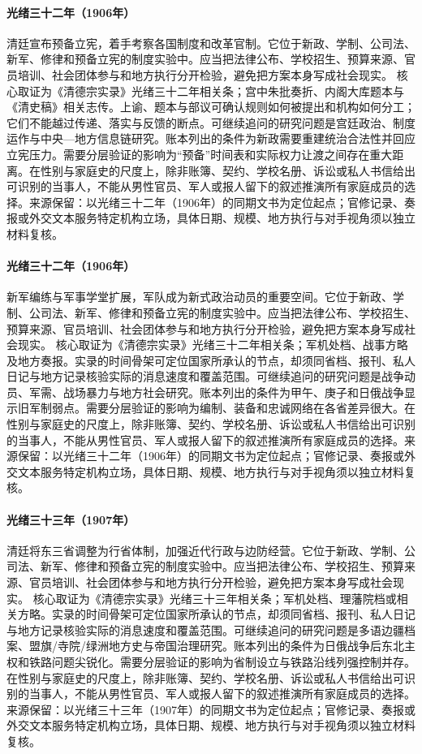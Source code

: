 \hypertarget{public:EQ-1906-CONSTITUTIONAL-PROMISE}{}\paragraph{光绪三十二年（1906年）}清廷宣布预备立宪，着手考察各国制度和改革官制。它位于新政、学制、公司法、新军、修律和预备立宪的制度实验中。应当把法律公布、学校招生、预算来源、官员培训、社会团体参与和地方执行分开检验，避免把方案本身写成社会现实。 核心取证为《清德宗实录》光绪三十二年相关条；宫中朱批奏折、内阁大库题本与《清史稿》相关志传。上谕、题本与部议可确认规则如何被提出和机构如何分工；它们不能越过传递、落实与反馈的断点。可继续追问的研究问题是宫廷政治、制度运作与中央—地方信息链研究。账本列出的条件为新政需要重建统治合法性并回应立宪压力。需要分层验证的影响为“预备”时间表和实际权力让渡之间存在重大距离。在性别与家庭史的尺度上，除非账簿、契约、学校名册、诉讼或私人书信给出可识别的当事人，不能从男性官员、军人或报人留下的叙述推演所有家庭成员的选择。来源保留：以光绪三十二年（1906年）的同期文书为定位起点；官修记录、奏报或外交文本服务特定机构立场，具体日期、规模、地方执行与对手视角须以独立材料复核。
\hypertarget{public:EQ-1906-NEW-ARMY-REFORM}{}\paragraph{光绪三十二年（1906年）}新军编练与军事学堂扩展，军队成为新式政治动员的重要空间。它位于新政、学制、公司法、新军、修律和预备立宪的制度实验中。应当把法律公布、学校招生、预算来源、官员培训、社会团体参与和地方执行分开检验，避免把方案本身写成社会现实。 核心取证为《清德宗实录》光绪三十二年相关条；军机处档、战事方略及地方奏报。实录的时间骨架可定位国家所承认的节点，却须同省档、报刊、私人日记与地方记录核验实际的消息速度和覆盖范围。可继续追问的研究问题是战争动员、军需、战场暴力与地方社会研究。账本列出的条件为甲午、庚子和日俄战争显示旧军制弱点。需要分层验证的影响为编制、装备和忠诚网络在各省差异很大。在性别与家庭史的尺度上，除非账簿、契约、学校名册、诉讼或私人书信给出可识别的当事人，不能从男性官员、军人或报人留下的叙述推演所有家庭成员的选择。来源保留：以光绪三十二年（1906年）的同期文书为定位起点；官修记录、奏报或外交文本服务特定机构立场，具体日期、规模、地方执行与对手视角须以独立材料复核。
\hypertarget{public:EQ-1907-MANCHURIAN-PROVINCES}{}\paragraph{光绪三十三年（1907年）}清廷将东三省调整为行省体制，加强近代行政与边防经营。它位于新政、学制、公司法、新军、修律和预备立宪的制度实验中。应当把法律公布、学校招生、预算来源、官员培训、社会团体参与和地方执行分开检验，避免把方案本身写成社会现实。 核心取证为《清德宗实录》光绪三十三年相关条；军机处档、理藩院档或相关方略。实录的时间骨架可定位国家所承认的节点，却须同省档、报刊、私人日记与地方记录核验实际的消息速度和覆盖范围。可继续追问的研究问题是多语边疆档案、盟旗/寺院/绿洲地方史与帝国治理研究。账本列出的条件为日俄战争后东北主权和铁路问题尖锐化。需要分层验证的影响为省制设立与铁路沿线列强控制并存。在性别与家庭史的尺度上，除非账簿、契约、学校名册、诉讼或私人书信给出可识别的当事人，不能从男性官员、军人或报人留下的叙述推演所有家庭成员的选择。来源保留：以光绪三十三年（1907年）的同期文书为定位起点；官修记录、奏报或外交文本服务特定机构立场，具体日期、规模、地方执行与对手视角须以独立材料复核。

